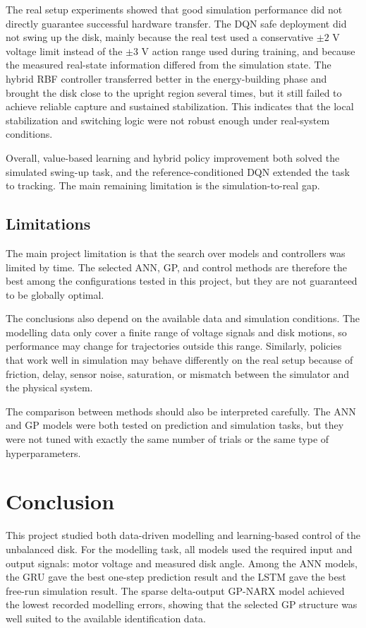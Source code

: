 \documentclass[conference]{IEEEtran}
\begin{document}
The real setup experiments showed that good simulation performance did not
directly guarantee successful hardware transfer. The DQN safe deployment did
not swing up the disk, mainly because the real test used a conservative
\(\pm 2\) V voltage limit instead of the \(\pm 3\) V action range used during
training, and because the measured real-state information differed from the
simulation state. The hybrid RBF controller transferred better in the
energy-building phase and brought the disk close to the upright region several
times, but it still failed to achieve reliable capture and sustained
stabilization. This indicates that the local stabilization and switching logic
were not robust enough under real-system conditions.

Overall, value-based learning and hybrid policy improvement both solved the
simulated swing-up task, and the reference-conditioned DQN extended the task to
tracking. The main remaining limitation is the simulation-to-real gap.



\subsection{Limitations}

The main project limitation is that the search over models and
controllers was limited by time. The selected ANN, GP, and control
methods are therefore the best among the configurations tested in this
project, but they are not guaranteed to be globally optimal.

The conclusions also depend on the available data and simulation
conditions. The modelling data only cover a finite range of voltage
signals and disk motions, so performance may change for trajectories
outside this range. Similarly, policies that work well in simulation
may behave differently on the real setup because of friction, delay,
sensor noise, saturation, or mismatch between the simulator and the
physical system.

The comparison between methods should also be interpreted carefully.
The ANN and GP models were both tested on prediction and simulation
tasks, but they were not tuned with exactly the same number of trials or
the same type of hyperparameters.

\section{Conclusion}

This project studied both data-driven modelling and learning-based control of
the unbalanced disk. For the modelling task, all models used the required input
and output signals: motor voltage and measured disk angle. Among the ANN
models, the GRU gave the best one-step prediction result and the LSTM gave the
best free-run simulation result. The sparse delta-output GP-NARX model achieved
the lowest recorded modelling errors, showing that the selected GP structure
was well suited to the available identification data.
\end{document}
